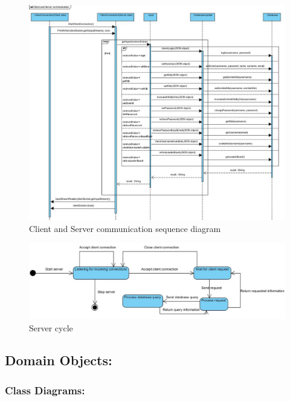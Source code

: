 \documentclass[letterpaper]{article}
\begin{document}
					\begin{figure}[H]
					\centering
					\includegraphics[width=180mm]{UML_Diagram/Sequence/Client_Server_Sequence_Diagram.jpg}
					\caption{Client and Server communication sequence diagram}
					\label{overflow}
					\end{figure}
			
					\begin{figure}[H]
					\centering
					\includegraphics[width=180mm]{UML_Diagram/State/Server_State_Diagram.jpg}
					\caption{Server cycle}
					\label{overflow}
					\end{figure}
			
			\vspace{0.2in}
			\subsection*{Domain Objects:}
			\vspace{0.1in}
			
				\vspace{0.2in}
				\subsubsection*{Class Diagrams:}
				\vspace{0.1in}
				
\end{document}
